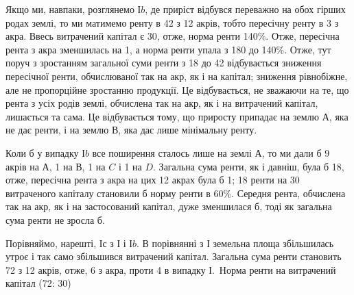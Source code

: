 Якщо ми, навпаки, розглянемо І$b$, де приріст відбувся переважно на обох
гірших родах землі, то ми матимемо ренту в 42 з 12 акрів, тобто
пересічну ренту в 3 з акра. Ввесь витрачений капітал є 30,
отже, норма ренти \deq{} 140\%. Отже, пересічна рента з акра зменшилась на 1, а норма ренти упала з 180 до 140\%. Отже, тут поруч з зростанням
загальної суми ренти з 18 до 42 відбувається зниження
пересічної ренти, обчислюваної так на акр, як і на капітал; зниження рівнобіжне,
але не пропорційне зростанню продукції. Це відбувається, не зважаючи на те,
що рента з усіх родів землі, обчислена так на акр, як і на витрачений капітал,
лишається та сама. Це відбувається тому, що  приросту припадає на
землю $А$, яка не дає ренти, і на землю $В$, яка дає лише мінімальну ренту.

Коли б у випадку І$b$ все поширення сталось лише на землі $А$, то ми
дали б 9 акрів на $А$, 1 на $В$, 1 на $C$ і 1 на $D$. Загальна сума ренти, як і давніш,
була б 18, отже, пересічна рента з акра на цих 12 акрах
була б 1; 18 ренти на 30 витраченого капіталу
становили б норму ренти в 60\%. Середня рента, обчислена так на акр,
як і на застосований капітал, дуже зменшилася б, тоді як загальна сума ренти
не зросла б.

Порівняймо, нарешті, І$с$ з І і І$b$. В порівнянні з І земельна площа збільшилась
утроє і так само збільшився витрачений капітал. Загальна сума ренти
становить 72 з 12 акрів, отже, 6 з акра, проти 4 в випадку І.~Норма ренти на витрачений капітал (72: 30)
\parbreak{}  %
